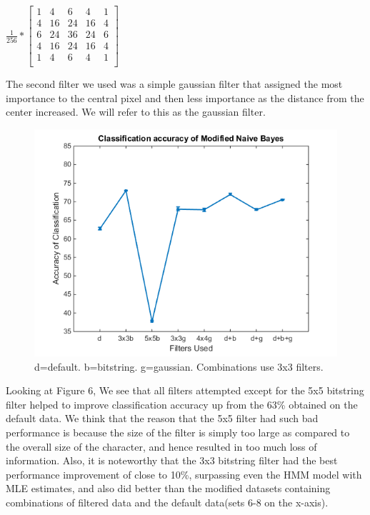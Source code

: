 \documentclass{article} %
\begin{document}
$\frac{1}{256}*\left[
\begin{array}{ccccc}
1&4&6&4&1\\
4&16&24&16&4\\
6&24&36&24&6\\
4&16&24&16&4\\
1&4&6&4&1\\
\end{array}
\right]$

The second filter we used was a simple gaussian filter that assigned the most importance to the central pixel and then less importance as the distance from the center increased. We will refer to this as the gaussian filter.

\begin{figure}[h]
\begin{center}
\includegraphics[scale=0.6]{nb_mod.png}
\end{center}
\caption{d=default. b=bitstring. g=gaussian. Combinations use 3x3 filters.}
\end{figure}

Looking at Figure 6, We see that all filters attempted except for the 5x5 bitstring filter helped to improve classification accuracy up from the 63\% obtained on the default data. We think that the reason that the 5x5 filter had such bad performance is because the size of the filter is simply too large as compared to the overall size of the character, and hence resulted in too much loss of information. Also, it is noteworthy that the 3x3 bitstring filter had the best performance improvement of close to 10\%, surpassing even the HMM model with MLE estimates, and also did better than the modified datasets containing combinations of filtered data and the default data(sets 6-8 on the x-axis).
\end{document}
